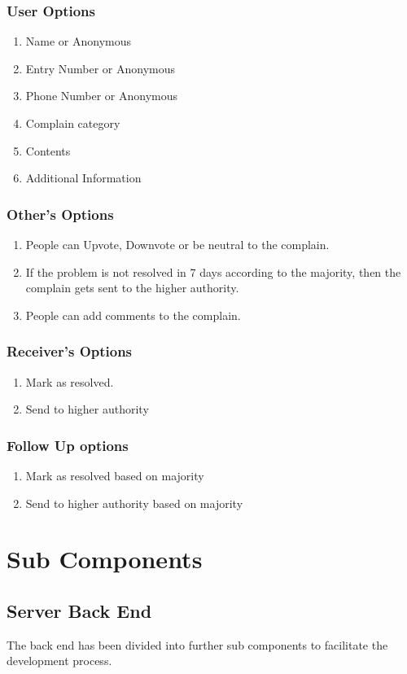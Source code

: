 \documentclass{article}
\begin{document}
			\subsubsection{User Options}
				\begin{enumerate}
					\item Name or Anonymous
					\item Entry Number or Anonymous 
					\item Phone Number or Anonymous
					\item Complain category
					\item Contents
					\item Additional Information
				\end{enumerate}
			\subsubsection{Other's Options}
				\begin{enumerate}
					\item People can Upvote, Downvote or be neutral to the complain.
					\item If the problem is not resolved in 7 days according to the majority, then the complain gets sent to the higher authority.
					\item People can add comments to the complain.
				\end{enumerate}
			\subsubsection{Receiver's Options}
				\begin{enumerate}
					\item Mark as resolved.
					\item Send to higher authority
				\end{enumerate}
			\subsubsection{Follow Up options}
				\begin{enumerate}
					\item Mark as resolved based on majority
					\item Send to higher authority based on majority
				\end{enumerate}
	\section{Sub Components}
			\subsection{Server Back End}
				The back end has been divided into further sub components to facilitate the development process.
\end{document}
